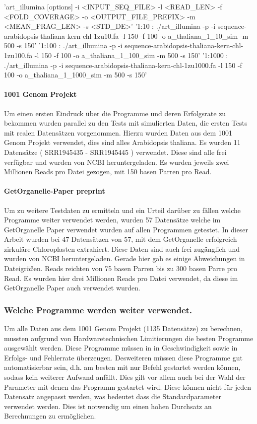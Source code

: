 \documentclass{scrartcl}
\begin{document}
'art\_illumina [options] -i <INPUT\_SEQ\_FILE> -l <READ\_LEN> -f <FOLD\_COVERAGE> -o <OUTPUT\_FILE\_PREFIX> -m <MEAN\_FRAG\_LEN> -s <STD\_DE>'
'1:10 : ./art\_illumina -p -i sequence-arabidopsis-thaliana-kern-chl-1zu10.fa -l 150 -f 100 -o a\_thaliana\_1\_10\_sim -m 500 -s 150'
'1:100 :  ./art\_illumina -p -i sequence-arabidopsis-thaliana-kern-chl-1zu100.fa -l 150 -f 100 -o a\_thaliana\_1\_100\_sim -m 500 -s 150'
'1:1000 :  ./art\_illumina -p -i sequence-arabidopsis-thaliana-kern-chl-1zu1000.fa -l 150 -f 100 -o a\_thaliana\_1\_1000\_sim -m 500 -s 150'

\paragraph{1001 Genom Projekt}
\label{sec-2-1-1-2}
Um einen ersten Eindruck über die Programme und deren Erfolgsrate zu bekommen wurden parallel zu den Tests mit simulierten Daten, die ersten Tests mit realen Datensätzen vorgenommen. 
Hierzu wurden Daten aus dem 1001 Genom Projekt\footnotemark[32]{} verwendet, dies sind alles Arabidopsis thaliana. Es wurden 11 Datensätze ( SRR1945435 - SRR1945445 ) verwendet. Diese sind alle
frei verfügbar und wurden von NCBI heruntergeladen. Es wurden jeweils zwei Millionen Reads pro Datei gezogen, mit 150 basen Parren pro Read.

\paragraph{GetOrganelle-Paper preprint}
\label{sec-2-1-1-3}
Um zu weitere Testdaten zu ermitteln und ein Urteil darüber zu fällen welche Programme weiter verwendet werden,
wurden 57 Datensätze welche im GetOrganelle Paper \footnotemark[22]{} verwendet wurden
auf allen Programmen getestet. In dieser Arbeit wurden bei 47 Datensätzen von 57, mit
dem GetOrganelle erfolgreich zirkuläre Chloroplasten extrahiert. Diese Daten sind auch frei zugänglich und wurden
von NCBI heruntergeladen. Gerade hier gab es einige Abweichungen in Dateigrößen. Reads reichten von 75 basen Parren 
bis zu 300 basen Parre pro Read. Es wurden hier drei Millionen Reads pro Datei verwendet, da diese im GetOrganelle Paper
auch verwendet wurden.


\subsubsection{Welche Programme werden weiter verwendet.}
\label{sec-2-1-2}
Um alle Daten aus dem 1001 Genom Projekt (1135 Datensätze) zu berechnen, mussten aufgrund 
von Hardwaretechnischen Limitierungen die besten Programme ausgewählt werden. Diese Programme müssen in
in Geschwindigkeit sowie in Erfolgs- und Fehlerrate überzeugen. Desweiteren müssen diese Programme gut automatisierbar sein, 
d.h. am besten mit nur Befehl gestartet werden können, sodass kein weiterer Aufwand anfällt. Dies gilt
vor allem auch bei der Wahl der Parameter mit denen das Programm gestartet wird. Diese können nicht 
für jeden Datensatz angepasst werden, was bedeutet dass die Standardparameter verwendet werden.
Dies ist notwendig um einen hohen Durchsatz an Berechnungen zu ermöglichen.
\end{document}
